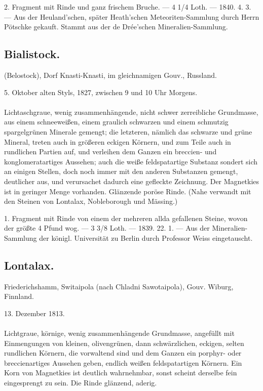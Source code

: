 \documentclass[a4paper, 11pt, oneside, polutonikogreek, german]{article}
\begin{document}
2. Fragment mit Rinde und ganz frischem Bruche. — 4 1/4 Loth. — 1840. 4. 3. — Aus der Heuland'schen, später Heath'schen Meteoriten-Sammlung durch Herrn Pötschke gekauft. Stammt aus der de Drée'schen Mineralien-Sammlung.
\subsection{Bialistock.}
\begin{center}
\small
(Belostock), Dorf Knasti-Knasti, im gleichnamigen Gouv., Russland.

5. Oktober alten Styls, 1827, zwischen 9 und 10 Uhr Morgens.
\end{center}
\paragraph{}
Lichtaschgraue, wenig zusammenhängende, nicht schwer zerreibliche Grundmasse, aus einem schneeweißen, einem graulich schwarzen und einem schmutzig spargelgrünen Minerale gemengt; die letzteren, nämlich das schwarze und grüne Mineral, treten auch in größeren eckigen Körnern, und zum Teile auch in rundlichen Partien auf, und verleihen dem Ganzen ein breccien- und konglomeratartiges Aussehen; auch die weiße feldspatartige Substanz sondert sich an einigen Stellen, doch noch immer mit den anderen Substanzen gemengt, deutlicher aus, und verursachet dadurch eine gefleckte Zeichnung. Der Magnetkies ist in geringer Menge vorhanden. Glänzende poröse Rinde. (Nahe verwandt mit den Steinen von Lontalax, Nobleborough und Mässing.)

1. Fragment mit Rinde von einem der mehreren allda gefallenen Steine, wovon der größte 4 Pfund wog. — 3 3/8 Loth. — 1839. 22. 1. — Aus der Mineralien-Sammlung der königl. Universität zu Berlin durch Professor Weiss eingetauscht.
\subsection{Lontalax.}
\begin{center}
\small
Friederichshamm, Switaipola (nach Chladni Sawotaipola), Gouv. Wiburg, Finnland.

13. Dezember 1813.
\end{center}
\paragraph{}
Lichtgraue, körnige, wenig zusammenhängende Grundmasse, angefüllt mit Einmengungen von kleinen, olivengrünen, dann schwärzlichen, eckigen, selten rundlichen Körnern, die vorwaltend sind und dem Ganzen ein porphyr- oder breccienartiges Aussehen geben, endlich weißen feldspatartigen Körnern. Ein Korn von Magnetkies ist deutlich wahrnehmbar, sonst scheint derselbe fein eingesprengt zu sein. Die Rinde glänzend, aderig.
\end{document}
